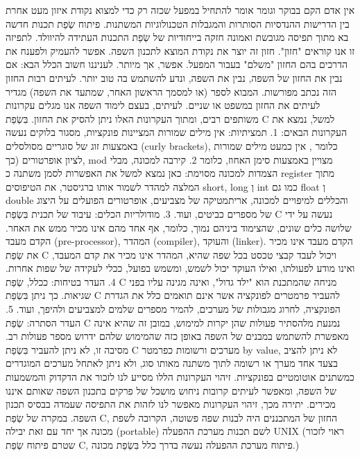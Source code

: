 \begin{טבלא}[!htbp]
      אין אדם הקם בבוקר וגומר אומר להתחיל במפעל שכזה רק כדי למצוא נקודת איזון מעט אחרת בין הדרישות ההנדסיות הסותרות והמגבלות הטכנולוגיות המשתנות.
      פיתוח שְׂפַת תכנות חדשה בא מתוך תפיסה מגובשת ואמונה חזקה בייחודיות של שְׂפַת התכנות העתידה להיוולד. לתפיזה זו אנו קוראים "חזון". חזון זה יוצר את נקודת המוצא לתכנון השפה. אפשר להעמיק ולפענח את הדרכים בהם החזון "משלם" בעבור המפעל. אפשר, אך מיותר. לעניננו חשוב הכלל הבא: אם נבין את החזון של השפה, נבין את השפה, ונדע להשתמש בה טוב יותר.
      לעיתים רבות החזון הזה נכתב מפורשות. המבוא לספר (או למסמך הראשון האחר, שמתעד את השפה) מגדיר לעיתים את החזון במשפט או שניים. לעיתים, בעצם לימוד השפה אנו מגלים עקרונות משותפים רבים, ומתוך העקרונות האלו ניתן להסיק את החזון.
      בִּשְׂפַת C למשל, נמצא את העקרונות הבאים:
      1. תמציתיות: אין מילים שמורות המציינות פונקציות, מסגור בלוקים נעשה באמצעות זוג של סוגריים מסולסלים (curly brackets), כלומר {}, אין כמעט מילים שמורות לציון אופרטורים (כך, mod מצויין באמצעות סימן האחוז, כלומר %
      2. קירבה למכונה, מבלי הצמדות למכונה מסוימת: כאן נמצא למשל את האפשרות לסמן משתנה כ register מתוך המלצה למהדר לשמור אותו ברגיסטר, את הטיפוסים short, long וְ int כמו גם float וְ double והכללים למיפויים למכונה, אריתמטיקה של מצביעים, אופרטורים הפועלים על היצוג של מספרים כביטים, ועוד.
      3. מודולריות הכלים: עיבוד של תכנית בִּשְׂפַת C נעשה על ידי שלושה כלים שונים, שהצימוד ביניהם נמוך, כלומר, אף אחד מהם אינו מכיר ממש את האחר. הקדם מעבד (pre-processor), המהדר (compiler), והעוקד (linker). הקדם מעבד אינו מכיר את שְׂפַת C ויכול לעבד קבצי טכסט בכל שפה שהיא, המהדר אינו מכיר את קדם המעבד, ואינו מודע לפעולתו, ואילו העוקד יכול לשמש, ומשמש בפועל, ככלי לעקידה של שפות אחרות.
      4. העדר בטיחות: ככלל, שְׂפַת C מניחה שהמתכנת הוא "ילד גדול", ואינה מגינה עליו בפני שגיאות. כך ניתן בִּשְׂפַת C להעביר פרמטרים לפונקציה אשר אינם תואמים כלל את הגדרת הפונקציה, לחרוג מגבולות של מערכים, להמיר מספרים שלמים למצביעים ולהיפך, ועוד.
      5. העדר הסתרה: שְׂפַת C נמנעת מלהסתיר פעולות שהן יקרות למימוש, במובן זה שהיא אינה מאפשרת להשתמש במבנים של השפה באופן כזה שהמימוש שלהם ידרוש מספר פעולות רב. מסיבה זו, לא ניתן להעביר בִּשְׂפַת C מערכים ורשומות כפרמטר by value, לא ניתן להציב בצעד אחד מערך או רשומה לתוך משתנה מאותו סוג, ולא ניתן לאתחל מערכים המוגדרים כמשתנים אוטומטיים בפונקציות.
      זיהוי העקרונות הללו מסייע לנו לזכור את הדקדוק והמשמעות של השפה, ומאפשר לעיתים קרובות ניחוש מושכל של פרקים בתכנון השפה שאותם איננו מכירים. יתירה מכך, זיהוי העקרונות מאפשר לנו לזהות את התפיסה שעמדה בבסיס תכנון השפה. במקרה של שְׂפַת C, החזון של המתכננים היה לבנות שפה פשוטה, הקרובה לשפת מכונה אך יחד עם זאת יבילה (portable) לשם תכנות מערכת ההפעלה UNIX (ראוי לזכור שטרם פיתוח שְׂפַת C, פיתוח מערכת ההפעלה נעשה בדרך כלל בִּשְׂפַת מכונה.)

\end{טבלא}
